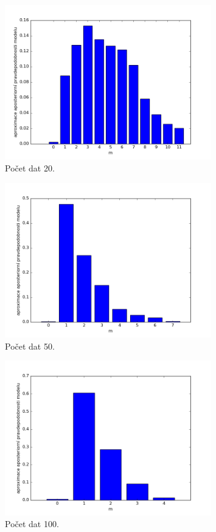 \documentclass[czech,master,public,dept470,male,cpdeclaration,oneside, python]{diploma}
\begin{document}
\begin{figure}
	[H]\centering\includegraphics[width=0.8\textwidth]{images/priklad3_20n_hist.png}\caption{Počet dat 20.}\label{model1}
\end{figure}

\begin{figure}
	[H]\centering\includegraphics[width=0.8\textwidth]{images/priklad3_50n_hist.png}\caption{Počet dat 50.}
\end{figure}

\begin{figure}
	[H]\centering\includegraphics[width=0.8\textwidth]{images/priklad3_100n_hist.png}\caption{Počet dat 100.}\label{model3}
\end{figure}
\end{document}
